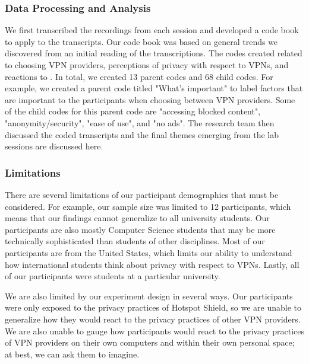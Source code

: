 \subsubsection{Data Processing and Analysis}
We first transcribed the recordings from each session and developed a code book to apply to the transcripts.
Our code book was based on general trends we discovered from an initial reading of the transcriptions.
The codes created related to choosing VPN providers, perceptions of privacy with respect to VPNs, and reactions to \tool.
In total, we created 13 parent codes and 68 child codes. For example, we created a parent code titled "What's important" to label factors that are important to the participants when choosing between VPN providers. Some of the child codes for this parent code are "accessing blocked content", "anonymity/security", "ease of use", and "no ads". The research team then discussed the coded transcripts and the final themes emerging from the lab sessions are discussed here.

\subsubsection{Limitations}
There are several limitations of our participant demographics that must be considered.
For example, our sample size was limited to 12 participants, which means that our findings cannot generalize to all university students.
Our participants are also mostly Computer Science students that may be more technically sophisticated than students of other disciplines.
Most of our participants are from the United States, which limits our ability to understand how international students think about privacy with respect to VPNs.
Lastly, all of our participants were students at a particular university.

We are also limited by our experiment design in several ways.
Our participants were only exposed to the privacy practices of Hotspot Shield, so we are unable to generalize how they would react to the privacy practices of other VPN providers.
We are also unable to gauge how participants would react to the privacy practices of VPN providers on their own computers and within their own personal space; at best, we can ask them to imagine.
